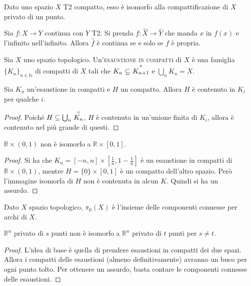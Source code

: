 \begin{cor}
    Dato uno spazio $X$ T2 compatto, esso \`e isomorfo alla compattificazione di $X$ privato di un punto.
\end{cor}

\begin{prop}
    Sia $f\colon X \longrightarrow Y$ continua con $Y$ T2. Si prenda ${\hat{f}\colon \hat{X}\longrightarrow\hat{Y}}$ che manda $x$ in $f(x)$ e l'infinito nell'infinito. Allora $\hat{f}$ \`e continua se e solo se $f$ \`e propria.
\end{prop}

\begin{defn}
    Sia $X$ uno spazio topologico. Un'\textsc{esaustione in compatti} di $X$ \`e una famiglia ${\{K_n\}_{n\in\mathbb{N}}}$ di compatti di $X$ tali che ${K_n\subseteq\ \open{K_{n+1}}}$ e $\bigcup_nK_n = X$.
\end{defn}

\begin{prop}
    Sia $K_n$ un'esaustione in compatti e $H$ un compatto. Allora $H$ \`e contenuto in $K_i$ per qualche $i$.
\end{prop}
\begin{proof}
    Poich\'e $H\subseteq \bigcup_n\stackrel{\circ}{K_n}$, $H$ \`e contenuto in un'unione finita di $K_i$, allora \`e contenuto nel pi\`u grande di questi.
\end{proof}

\begin{ex}
    $\mathbb{R}\times(0,1)$ non \`e isomorfo a $\mathbb{R}\times[0,1]$. %
\end{ex}
\begin{proof}
    Si ha che $K_n = [-n,n]\times[\frac{1}{n}, 1-\frac{1}{n}]$ \`e un esaustione in compatti di $\mathbb{R}\times(0,1)$, mentre $H=\{0\}\times[0,1]$ \`e un compatto dell'altro spazio. Per\`o l'immagine isomorfa di $H$ non \`e contenuta in alcun $K$. Quindi si ha un assurdo.
\end{proof}

\begin{defn}
    Dato $X$ spazio topologico, $\pi_0(X)$ \`e l'insieme delle componenti connesse per archi di $X$.
\end{defn}

\begin{ex}
    $\mathbb{R}^n$ privato di $s$ punti non \`e isomorfo a $\mathbb{R}^n$
    privato di $t$ punti per $s\ne t$.
\end{ex}
\begin{proof}
    L'idea di base \`e quella di prendere esaustioni in compatti dei due spazi.
    Allora i compatti delle esaustioni (almeno definitivamente) avranno un buco per ogni punto tolto. Per ottenere un assurdo, basta contare le componenti connesse delle esaustioni.
\end{proof}
